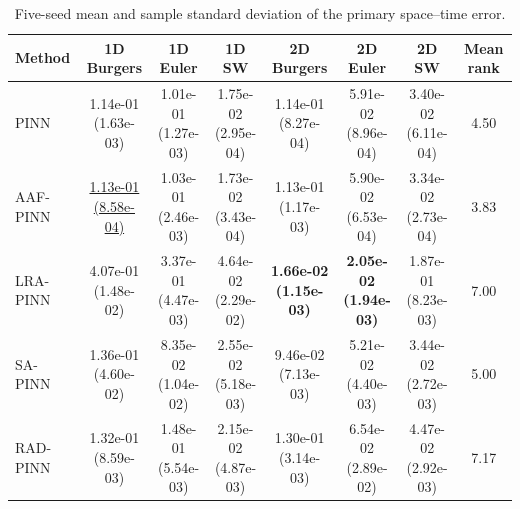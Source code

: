 \begin{table}[t]
\centering
\caption{Five-seed mean and sample standard deviation of the primary space--time error.}
\label{tab:primary_comparison}
\begin{tabular}{lccccccc}
\toprule
Method & 1D Burgers & 1D Euler & 1D SW & 2D Burgers & 2D Euler & 2D SW & Mean rank \\
\midrule
PINN & \shortstack{1.14e-01\\(1.63e-03)} & \shortstack{1.01e-01\\(1.27e-03)} & \shortstack{1.75e-02\\(2.95e-04)} & \shortstack{1.14e-01\\(8.27e-04)} & \shortstack{5.91e-02\\(8.96e-04)} & \shortstack{3.40e-02\\(6.11e-04)} & 4.50 \\
AAF-PINN & \shortstack{\underline{1.13e-01}\\\underline{(8.58e-04)}} & \shortstack{1.03e-01\\(2.46e-03)} & \shortstack{1.73e-02\\(3.43e-04)} & \shortstack{1.13e-01\\(1.17e-03)} & \shortstack{5.90e-02\\(6.53e-04)} & \shortstack{3.34e-02\\(2.73e-04)} & 3.83 \\
LRA-PINN & \shortstack{4.07e-01\\(1.48e-02)} & \shortstack{3.37e-01\\(4.47e-03)} & \shortstack{4.64e-02\\(2.29e-02)} & \shortstack{\textbf{1.66e-02}\\\textbf{(1.15e-03)}} & \shortstack{\textbf{2.05e-02}\\\textbf{(1.94e-03)}} & \shortstack{1.87e-01\\(8.23e-03)} & 7.00 \\
SA-PINN & \shortstack{1.36e-01\\(4.60e-02)} & \shortstack{8.35e-02\\(1.04e-02)} & \shortstack{2.55e-02\\(5.18e-03)} & \shortstack{9.46e-02\\(7.13e-03)} & \shortstack{5.21e-02\\(4.40e-03)} & \shortstack{3.44e-02\\(2.72e-03)} & 5.00 \\
RAD-PINN & \shortstack{1.32e-01\\(8.59e-03)} & \shortstack{1.48e-01\\(5.54e-03)} & \shortstack{2.15e-02\\(4.87e-03)} & \shortstack{1.30e-01\\(3.14e-03)} & \shortstack{6.54e-02\\(2.89e-02)} & \shortstack{4.47e-02\\(2.92e-03)} & 7.17 \\

\end{tabular}
\end{table}
